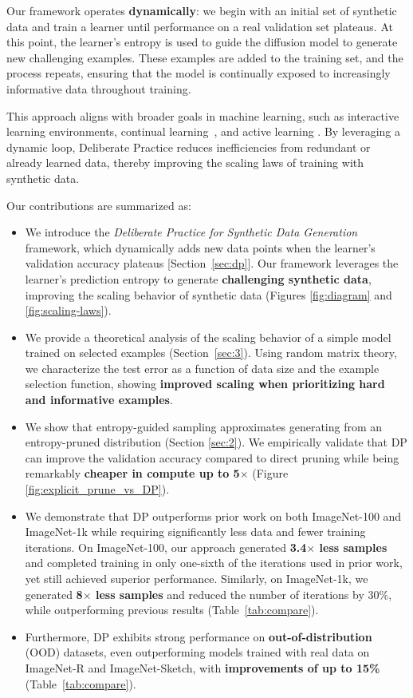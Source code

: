 Our framework operates \textbf{dynamically}: we begin with an initial set of synthetic data and train a learner until performance on a real validation set plateaus. At this point, the learner's entropy is used to guide the diffusion model to generate new challenging examples. These examples are added to the training set, and the process repeats, ensuring that the model is continually exposed to increasingly informative data throughout training.

This approach aligns with broader goals in machine learning, such as interactive learning environments, continual learning~\citep{kirkpatrick2017overcoming}, and active learning \citep{settles2009active}. By leveraging a dynamic loop, Deliberate Practice reduces inefficiencies from redundant or already learned data, thereby improving the scaling laws of training with synthetic data.

Our contributions are summarized as:
\begin{itemize}[noitemsep]
    \item We introduce the \textit{Deliberate Practice for Synthetic Data Generation} framework, which dynamically adds new data points when the learner's validation accuracy plateaus [Section~\ref{sec:dp}]. Our framework leverages the learner's prediction entropy to generate\textbf{ challenging synthetic data}, improving the scaling behavior of synthetic data (Figures \ref{fig:diagram} and \ref{fig:scaling-laws}).
    \item We provide a theoretical analysis of the scaling behavior of a simple model trained on selected examples (Section~\ref{sec:3}). Using random matrix theory, we characterize the test error as a function of data size and the example selection function, showing \textbf{improved scaling when prioritizing hard and informative examples}.
    \item We show that entropy-guided sampling approximates generating from an entropy-pruned distribution (Section \ref{sec:2}). We empirically validate that DP can improve the validation accuracy compared to direct pruning while being remarkably \textbf{cheaper in compute up to 5$\times$} (Figure \ref{fig:explicit_prune_vs_DP}).
    \item We demonstrate that DP outperforms prior work on both ImageNet-100 and ImageNet-1k while requiring significantly less data and fewer training iterations. On ImageNet-100, our approach generated \textbf{3.4$\times$ less samples} and completed training in only one-sixth of the iterations used in prior work, yet still achieved superior performance. Similarly, on ImageNet-1k, we generated \textbf{8$\times$ less samples} and reduced the number of iterations by 30\%, while outperforming previous results (Table~\ref{tab:compare}).
    \item Furthermore, DP exhibits strong performance on \textbf{out-of-distribution} (OOD) datasets, even outperforming models trained with real data on ImageNet-R and ImageNet-Sketch, with \textbf{improvements of up to 15\%} (Table~\ref{tab:compare}).
\end{itemize}


